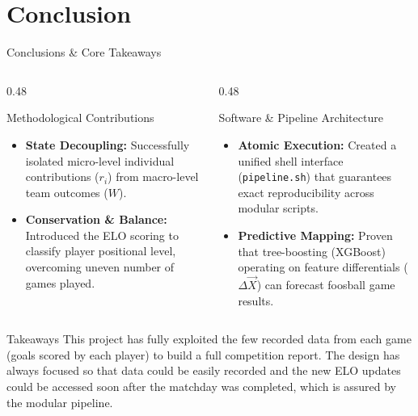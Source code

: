 \documentclass[10pt, aspectratio=169]{beamer}
\begin{document}
\section{Conclusion}
\begin{frame}{Conclusions \& Core Takeaways}


    \vspace{0.8em}
    \begin{columns}[T]
        \begin{column}{0.48\textwidth}
            \begin{block}{Methodological Contributions}
                \small
                \begin{itemize}
                    \item \textbf{State Decoupling:} Successfully isolated micro-level individual contributions ($r_i$) from macro-level team outcomes ($W$).
                    \item \textbf{Conservation \& Balance:} Introduced the ELO scoring to classify player positional level, overcoming uneven number of games played.
                \end{itemize}
            \end{block}
        \end{column}
        
        \begin{column}{0.48\textwidth}
            \begin{block}{Software \& Pipeline Architecture}
                \small
                \begin{itemize}
                    \item \textbf{Atomic Execution:} Created a unified shell interface (\texttt{pipeline.sh}) that guarantees exact reproducibility across modular scripts.
                    \item \textbf{Predictive Mapping:} Proven that tree-boosting (XGBoost) operating on feature differentials ($\Delta \vec{X}$) can forecast foosball game results.
                \end{itemize}
            \end{block}
        \end{column}
    \end{columns}

    \vspace{1em}
    \begin{alertblock}{Takeaways}
	This project has fully exploited the few recorded data from each game (goals scored by each player) to build a full competition report. The design has always focused so that data could be easily recorded and the new ELO updates could be accessed soon after the matchday was completed, which is assured by the modular pipeline.
    \end{alertblock}

\end{frame}
\end{document}
